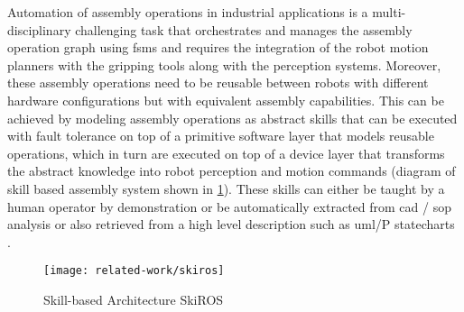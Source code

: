 Automation of assembly operations in industrial applications \cite{Patel2012} is a multi-disciplinary challenging task that orchestrates and manages the assembly operation graph using \glspl{fsm} \cite{Smits2010,Stefan2014} and requires the integration of the robot motion planners with the gripping tools \cite{Thomas2015} along with the perception systems. Moreover, these assembly operations need to be reusable \cite{Butting2016,Andersen2014} between robots with different hardware configurations \cite{Thomas2002} but with equivalent assembly capabilities. This can be achieved by modeling assembly operations as abstract skills \cite{Holz2015,aimm2012,Pedersen2014} that can be executed with fault tolerance \cite{ThomasICRA2003} on top of a primitive software layer that models reusable operations, which in turn are executed on top of a device layer that transforms the abstract knowledge into robot perception and motion commands (diagram of skill based assembly system shown in \cref{fig:skiros}). These skills can either be taught by a human operator by demonstration or be automatically extracted from \gls{cad} / \gls{sop} analysis \cite{Thomas2001} or also retrieved from a high level description such as \gls{uml}/P statecharts \cite{ThomasICRA2013}.


\begin{figure}[H]
	\centering
	\texttt{[image: related-work/skiros]}
	\caption[Skill-based Architecture SkiROS]{Skill-based Architecture SkiROS \cite{Holz2015}}
	\label{fig:skiros}
\end{figure}




